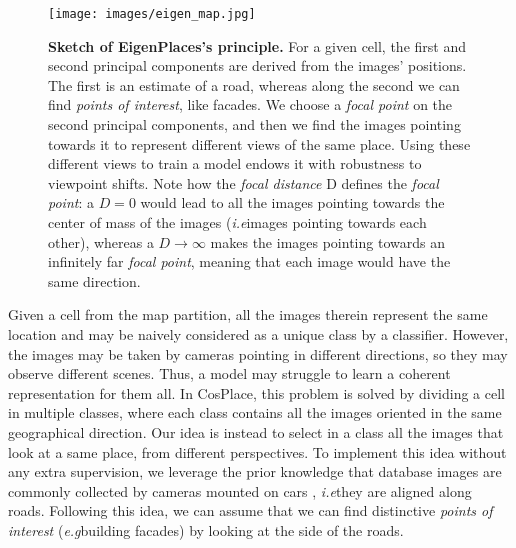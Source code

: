 \documentclass[10pt,twocolumn,letterpaper]{article}
\def\eg{\emph{e.g}\onedot}
\def\ie{\emph{i.e}\onedot}
\begin{document}
\begin{figure}
    \begin{center}
    \texttt{[image: images/eigen\_map.jpg]}
    \end{center}
    \caption{\textbf{Sketch of EigenPlaces's principle.}
    For a given cell, the first and second principal components are derived from the images' positions.
    The first is an estimate of a road, whereas along the second we can find \textit{points of interest}, like facades.
    We choose a \textit{focal point} on the second principal components, and then we find the images pointing towards it to represent different views of the same place. Using these different views to train a model endows it with robustness to viewpoint shifts.
    Note how the \textit{focal distance} D defines the \textit{focal point}: a $D=0$ would lead to all the images pointing towards the center of mass of the images (\ie images pointing towards each other), whereas a $D \rightarrow \infty$ makes the images pointing towards an infinitely far \textit{focal point}, meaning that each image would have the same direction.
    }
    \label{fig:eigen_map}
\end{figure}
 Given a cell from the map partition, all the images therein represent the same location and may be naively considered as a unique class by a classifier. However, the images may be taken by cameras pointing in different directions, so they may observe different scenes.
Thus, a model may struggle to learn a coherent representation for them all.
In CosPlace, this problem is solved by dividing a cell in multiple classes, where each class contains all the images oriented in the same geographical direction. 
Our idea is instead to select in a class all the images that look at a same place, from different perspectives.
To implement this idea without any extra supervision, we leverage the prior knowledge that database images are commonly collected by cameras mounted on cars \cite{Torii_2015_pitts250k, Torii_2018_tokyo247, Maddern_2017_robotCar, Berton_2021_svox, Alibey_2022_gsvcities, Milford_2008_st_lucia, Chen_2011_san_francisco, Warburg_2020_msls}, \ie they are aligned along roads.
Following this idea, we can assume that we can find distinctive \textit{points of interest} (\eg building facades) by looking at the side of the roads. 
\end{document}
